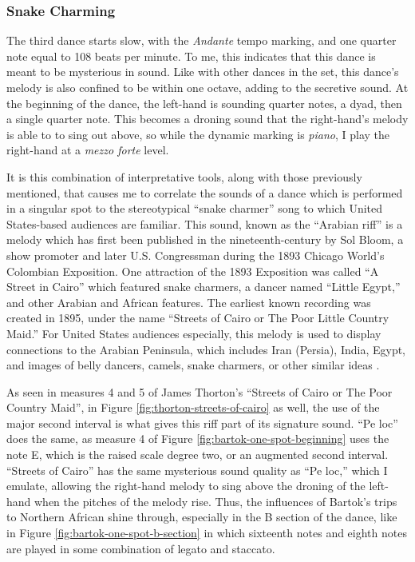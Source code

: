 \subsubsection{Snake Charming}

The third dance starts slow, with the \textit{Andante} tempo marking, and one quarter note equal to 108 beats per minute. To me, this indicates that this dance is meant to be mysterious in sound. Like with other dances in the set, this dance's melody is also confined to be within one octave, adding to the secretive sound. At the beginning of the dance, the left-hand is sounding quarter notes, a dyad, then a single quarter note. This becomes a droning sound that the right-hand's melody is able to to sing out above, so while the dynamic marking is \textit{piano}, I play the right-hand at a \textit{mezzo forte} level. 

It is this combination of interpretative tools, along with those previously mentioned, that causes me to correlate the sounds of a dance which is performed in a singular spot to the stereotypical ``snake charmer'' song to which United States-based audiences are familiar. This sound, known as the ``Arabian riff'' is a melody which has first been published in the nineteenth-century by Sol Bloom, a show promoter and later U.S. Congressman during the 1893 Chicago World's Colombian Exposition\autocite{Shira}. One attraction of the 1893 Exposition was called ``A Street in Cairo'' which featured snake charmers, a dancer named ``Little Egypt,'' and other Arabian and African features. The earliest known recording was created in 1895, under the name ``Streets of Cairo or The Poor Little Country Maid.'' For United States audiences especially, this melody is used to display connections to the Arabian Peninsula, which includes Iran (Persia), India, Egypt, and images of belly dancers, camels, snake charmers, or other similar ideas \autocite{Shira}.

As seen in measures 4 and 5 of James Thorton's ``Streets of Cairo or The Poor Country Maid'', in Figure \ref{fig:thorton-streets-of-cairo}\autocite{Thorton_1895} as well, the use of the major second interval is what gives this riff part of its signature sound. ``Pe loc'' does the same, as measure 4 of Figure \ref{fig:bartok-one-spot-beginning}\autocite{Lung_2016} uses the note E\musSharp{}, which is the raised scale degree two, or an augmented second interval. ``Streets of Cairo'' has the same mysterious sound quality as ``Pe loc,'' which I emulate, allowing the right-hand melody to sing above the droning of the left-hand when the pitches of the melody rise. Thus, the influences of Bartok's trips to Northern African shine through, especially in the B section of the dance, like in Figure \ref{fig:bartok-one-spot-b-section}\autocite{Lung_2016} in which sixteenth notes and eighth notes are played in some combination of legato and staccato.

